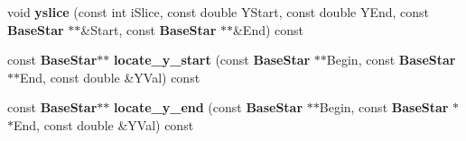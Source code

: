 \begin{CompactItemize}
\item 
{}
void {\bf yslice} (const int i\-Slice, const double YStart, const double YEnd, const {\bf Base\-Star} $\ast$$\ast$\&Start, const {\bf Base\-Star} $\ast$$\ast$\&End) const\label{class_fastfinder_a5}

\item 
{}
const {\bf Base\-Star}$\ast$$\ast$ {\bf locate\_\-y\_\-start} (const {\bf Base\-Star} $\ast$$\ast$Begin, const {\bf Base\-Star} $\ast$$\ast$End, const double \&YVal) const\label{class_fastfinder_a6}

\item 
{}
const {\bf Base\-Star}$\ast$$\ast$ {\bf locate\_\-y\_\-end} (const {\bf Base\-Star} $\ast$$\ast$Begin, const {\bf Base\-Star} $\ast$$\ast$End, const double \&YVal) const\label{class_fastfinder_a7}

\end{CompactItemize}
